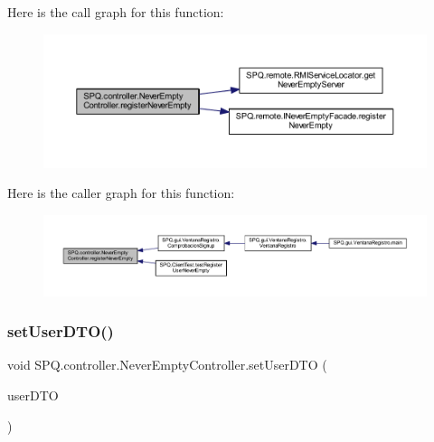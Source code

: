 Here is the call graph for this function\+:
\nopagebreak
\begin{figure}[H]
\begin{center}
\leavevmode
\includegraphics[width=350pt]{class_s_p_q_1_1controller_1_1_never_empty_controller_ad02b010ba25f24bf105fe7b4605e3de1_cgraph}
\end{center}
\end{figure}
Here is the caller graph for this function\+:
\nopagebreak
\begin{figure}[H]
\begin{center}
\leavevmode
\includegraphics[width=350pt]{class_s_p_q_1_1controller_1_1_never_empty_controller_ad02b010ba25f24bf105fe7b4605e3de1_icgraph}
\end{center}
\end{figure}
\mbox{\label{class_s_p_q_1_1controller_1_1_never_empty_controller_a847c0288b7c18327d81c092f8c234d01}} 
\subsubsection{\texorpdfstring{set\+User\+D\+T\+O()}{setUserDTO()}}
{\footnotesize\ttfamily void S\+P\+Q.\+controller.\+Never\+Empty\+Controller.\+set\+User\+D\+TO (\begin{DoxyParamCaption}\item[{\mbox{\hyperlink{class_s_p_q_1_1dto_1_1_user_d_t_o}{User\+D\+TO}}}]{user\+D\+TO }\end{DoxyParamCaption})}


